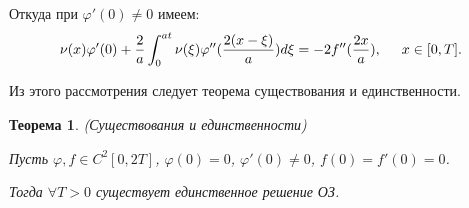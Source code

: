 \documentclass{article}
\newtheorem{theorem}{Теорема}
\begin{document}
Откуда при $\varphi'(0) \neq 0$ имеем:
\begin{equation*}
	\nu(x) \varphi'(0) + \dfrac{2}{a} \int_0^{at} \nu(\xi) \varphi''(\frac{2 (x - \xi)}{a}) d\xi = - 2 f''(\frac{2x}{a}), 
	\hspace{0.5cm} x \in [0,T].
\end{equation*}

Из этого рассмотрения следует теорема существования и единственности.

\begin{theorem}
(Существования и единственности)

Пусть $\varphi, f \in C^2[0,2T]$, $\varphi(0) = 0$, $\varphi'(0) \neq 0$, $f(0) = f'(0) = 0$.

Тогда $\forall T > 0$ существует единственное решение ОЗ.
\end{theorem}
\end{document}

